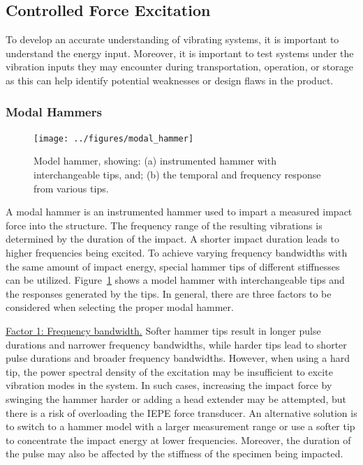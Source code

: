 \documentclass[12pt,letter]{article}
\begin{document}

\pagebreak

\subsection{Controlled Force Excitation}

To develop an accurate understanding of vibrating systems, it is important to understand the energy input. Moreover, it is important to test systems under the vibration inputs they may encounter during transportation, operation, or storage as this can help identify potential weaknesses or design flaws in the product.

\subsubsection{Modal Hammers}



\begin{figure}[H]
	\centering
	\texttt{[image: ../figures/modal\_hammer]}
	\caption{Model hammer, showing: (a) instrumented hammer with interchangeable tips, and; (b) the temporal and frequency response from various tips.}
	\label{fig:modal_hammer}
\end{figure} 


A modal hammer is an instrumented hammer used to impart a measured impact force into the structure. The frequency range of the resulting vibrations is determined by the duration of the impact. A shorter impact duration leads to higher frequencies being excited. To achieve varying frequency bandwidths with the same amount of impact energy, special hammer tips of different stiffnesses can be utilized.  Figure~\ref{fig:modal_hammer} shows a model hammer with interchangeable tips and the responses generated by the tips. In general, there are three factors to be considered when selecting the proper modal hammer.

\underline{Factor 1: Frequency bandwidth.} Softer hammer tips result in longer pulse durations and narrower frequency bandwidths, while harder tips lead to shorter pulse durations and broader frequency bandwidths. However, when using a hard tip, the power spectral density of the excitation may be insufficient to excite vibration modes in the system. In such cases, increasing the impact force by swinging the hammer harder or adding a head extender may be attempted, but there is a risk of overloading the IEPE force transducer. An alternative solution is to switch to a hammer model with a larger measurement range or use a softer tip to concentrate the impact energy at lower frequencies. Moreover, the duration of the pulse may also be affected by the stiffness of the specimen being impacted.
\end{document}
